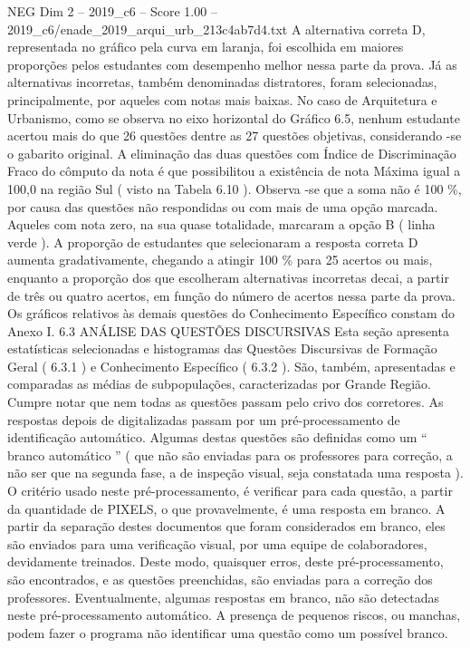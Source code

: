 \begin{textsample}{NEG Dim 2 – 2019\_c6 – Score 1.00 – 2019\_c6/enade\_2019\_arqui\_urb\_213c4ab7d4.txt}
A alternativa correta D, representada no gráfico pela curva em laranja, foi escolhida em maiores proporções pelos estudantes com desempenho melhor nessa parte da prova.
Já as alternativas incorretas, também denominadas distratores, foram selecionadas, principalmente, por aqueles com notas mais baixas.
No caso de Arquitetura e Urbanismo, como se observa no eixo horizontal do Gráfico 6.5, nenhum estudante acertou mais do que 26 questões dentre as 27 questões objetivas, considerando -se o gabarito original.
A eliminação das duas questões com Índice de Discriminação Fraco do cômputo da nota é que possibilitou a existência de nota Máxima igual a 100,0 na região Sul ( visto na Tabela 6.10 ).
Observa -se que a soma não é 100 \%, por causa das questões não respondidas ou com mais de uma opção marcada.
Aqueles com nota zero, na sua quase totalidade, marcaram a opção B ( linha verde ).
A proporção de estudantes que selecionaram a resposta correta D aumenta gradativamente, chegando a atingir 100 \% para 25 acertos ou mais, enquanto a proporção dos que escolheram alternativas incorretas decai, a partir de três ou quatro acertos, em função do número de acertos nessa parte da prova.
Os gráficos relativos às demais questões do Conhecimento Específico constam do Anexo I. 6.3 ANÁLISE DAS QUESTÕES DISCURSIVAS Esta seção apresenta estatísticas selecionadas e histogramas das Questões Discursivas de Formação Geral ( 6.3.1 ) e Conhecimento Específico ( 6.3.2 ).
São, também, apresentadas e comparadas as médias de subpopulações, caracterizadas por Grande Região.
Cumpre notar que nem todas as questões passam pelo crivo dos corretores.
As respostas depois de digitalizadas passam por um pré-processamento de identificação automático.
Algumas destas questões são definidas como um “ branco automático ” ( que não são enviadas para os professores para correção, a não ser que na segunda fase, a de inspeção visual, seja constatada uma resposta ).
O critério usado neste pré-processamento, é verificar para cada questão, a partir da quantidade de PIXELS, o que provavelmente, é uma resposta em branco.
A partir da separação destes documentos que foram considerados em branco, eles são enviados para uma verificação visual, por uma equipe de colaboradores, devidamente treinados.
Deste modo, quaisquer erros, deste pré-processamento, são encontrados, e as questões preenchidas, são enviadas para a correção dos professores.
Eventualmente, algumas respostas em branco, não são detectadas neste pré-processamento automático.
A presença de pequenos riscos, ou manchas, podem fazer o programa não identificar uma questão como um possível branco.

\end{textsample}
